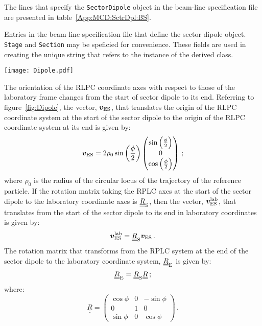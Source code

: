 The lines that specify the \texttt{SectorDipole} object in the
beam-line specification file are presented in
table~\ref{App:MCD:SctrDpl:BS}. 
\begin{table}[h]
  \caption{
    Entries in the beam-line specification file that define the
    sector dipole object.
    \texttt{Stage} and \texttt{Section} may be speficied for
    convenience.
    These fields are used in creating the unique string that refers
    to the instance of the derived class.
  }
  \label{App:MCD:SctrDpl:BS}
  \begin{center}
    \texttt{[image: Dipole.pdf]}
  \end{center}
\end{table}

The orientation of the RLPC coordinate axes with respect to those of
the laboratory frame changes from the start of sector dipole to its
end.
Referring to figure~\ref{fig:Dipole}, the vector, $\bm{v}_{\rm ES}$,
that translates the origin of the RLPC coordinate system at the start
of the sector dipole to the origin of the RLPC coordinate system at
its end is given by:
\begin{equation}
  \bm{v}_{\rm ES} = 2 \rho_0 \sin\left( \frac{\phi}{2} \right)
                     \begin{pmatrix}
                       \sin\left( \frac{\phi}{2} \right) \\
                       0                                 \\
                       \cos\left( \frac{\phi}{2} \right)
                     \end{pmatrix} \,;
\end{equation}
where $\rho_0$ is the radius of the circular locus of the trajectory
of the reference particle.
If the rotation matrix taking the RPLC axes at the start of the sector
dipole to the laboratory coordinate axes is
$\underline{\underline{R}}_{\rm S}$, then the vector,
$\bm{v}^{\rm lab}_{\rm ES}$, that translates from the start 
of the sector dipole to its end in laboratory coordinates is given by:
\begin{equation}
  \bm{v}^{\rm lab}_{\rm ES} = \underline{\underline{R}}_{\rm S} \bm{v}_{\rm ES} \,.
\end{equation}
The rotation matrix that transforms from the RPLC system at the end
of the sector dipole to the laboratory coordinate system,
$\underline{\underline{R}}_{\rm E}$ is given by:
\begin{equation}
  \underline{\underline{R}}_{\rm E} =
      \underline{\underline{R}}_{\rm S} \underline{\underline{R}} \, ;
\end{equation}
where:
\begin{equation}
  \underline{\underline{R}} = 
        \begin{pmatrix}
          \cos \phi & 0 & -\sin \phi \\
          0         & 1 &  0         \\
          \sin \phi & 0 &  \cos \phi 
        \end{pmatrix} \, .
\end{equation}

